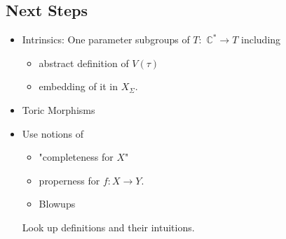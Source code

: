 \documentclass[a4paper,12pt]{amsart}
\newcommand{\C}{\ensuremath{\mathbb{C}}}
\begin{document}
\subsection*{Next Steps}
\begin{itemize}
	\item Intrinsics: One parameter subgroups of $T:$ $\C^*\to T$ including 
	 \begin{itemize}
	 	\item abstract definition of $V(\tau)$ 
	 	\item embedding of it in $X_\Sigma.$
	 \end{itemize}
	 \item Toric Morphisms
	 \item Use notions of 
	 \begin{itemize}
	 	\item "completeness for $X$"
	 	\item properness for $f:X\to Y.$
	 	\item Blowups
\end{itemize}	  
Look up definitions and their intuitions. 
\end{itemize}
\newpage
\end{document}
